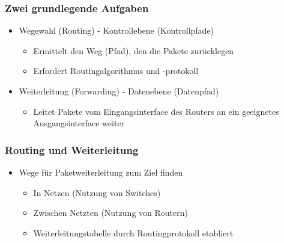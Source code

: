     \subsubsection{Zwei grundlegende Aufgaben}
      \begin{itemize}
        \item Wegewahl (Routing) - Kontrollebene (Kontrollpfade)
          \begin{itemize}
            \item Ermittelt den Weg (Pfad), den die Pakete zurücklegen
            \item Erfordert Routingalgorithmus und -protokoll
          \end{itemize}
        \item Weiterleitung (Forwarding) - Datenebene (Datenpfad)
          \begin{itemize}
            \item Leitet Pakete vom Eingangsinterface des Routers an ein geeignetes Ausgangsinterface
              weiter
          \end{itemize}
      \end{itemize}
    \subsubsection{Routing und Weiterleitung}
      \begin{itemize}
        \item Wege für Paketweiterleitung zum Ziel finden
          \begin{itemize}
            \item In Netzen (Nutzung von Switches)
            \item Zwischen Netzten (Nutzung von Routern)
            \item Weiterleitungstabelle durch Routingprotokoll etabliert
          \end{itemize}
      \end{itemize}
